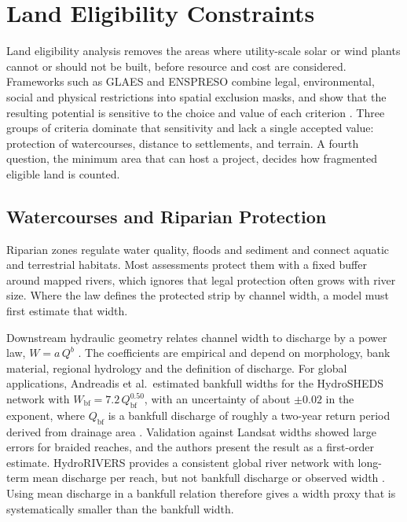 
\section{Land Eligibility Constraints}
\label{sec:land_eligibility_review}

Land eligibility analysis removes the areas where utility-scale solar or
wind plants cannot or should not be built, before resource and cost are
considered. Frameworks such as GLAES and ENSPRESO combine legal,
environmental, social and physical restrictions into spatial exclusion
masks, and show that the resulting potential is sensitive to the choice
and value of each criterion \cite{ryberg2018,Ruiz2019}. Three groups of
criteria dominate that sensitivity and lack a single accepted value:
protection of watercourses, distance to settlements, and terrain. A
fourth question, the minimum area that can host a project, decides how
fragmented eligible land is counted.

\subsection{Watercourses and Riparian Protection}
\label{subsec:riparian_review}

Riparian zones regulate water quality, floods and sediment and connect
aquatic and terrestrial habitats. Most assessments protect them with a
fixed buffer around mapped rivers, which ignores that legal protection
often grows with river size. Where the law defines the protected strip
by channel width, a model must first estimate that width.

Downstream hydraulic geometry relates channel width to discharge by a
power law, $W = a\,Q^{b}$ \cite{leopold1953}. The coefficients are
empirical and depend on morphology, bank material, regional hydrology and
the definition of discharge. For global applications, Andreadis et al.\
estimated bankfull widths for the HydroSHEDS network with
$W_{\mathrm{bf}} = 7.2\,Q_{\mathrm{bf}}^{0.50}$, with an uncertainty of
about $\pm 0.02$ in the exponent, where $Q_{\mathrm{bf}}$ is a bankfull
discharge of roughly a two-year return period derived from drainage area
\cite{andreadis2013}. Validation against Landsat widths showed large
errors for braided reaches, and the authors present the result as a
first-order estimate. HydroRIVERS provides a consistent global river
network with long-term mean discharge per reach, but not bankfull
discharge or observed width \cite{lehner2013}. Using mean discharge in a
bankfull relation therefore gives a width proxy that is systematically
smaller than the bankfull width.

